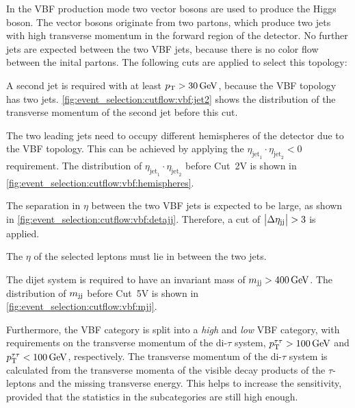 In the VBF production mode two vector bosons are used to produce the Higgs boson.
The vector bosons originate from two partons, which produce two jets with high transverse momentum
in the forward region of the detector.
No further jets are expected between the two VBF jets, because there is no color flow between the inital partons.
The following cuts are applied to select this topology:
\begin{description}[style=nextline,leftmargin=1cm]
    \item[(1V) Subleading jet momentum]
        A second jet is required with at least $\pt > \SI{30}{\GeV}$, because the VBF topology has two jets.
        \cref{fig:event_selection:cutflow:vbf:jet2} shows the distribution of the transverse momentum of the second
        jet before this cut.
    \item[(2V) Opposite hemispheres]
        The two leading jets need to occupy different hemispheres of the detector due to the VBF topology.
        This can be achieved by applying the $\eta_{\text{jet}_1} \cdot \eta_{\text{jet}_2} < 0$ requirement.
        The distribution of $\eta_{\text{jet}_1} \cdot \eta_{\text{jet}_2}$ before Cut~2V is shown in \cref{fig:event_selection:cutflow:vbf:hemispheres}.
    \item[(3V) Angular separation of two leading jets]
        The separation in $\eta$ between the two VBF jets is expected to be large, as shown in \cref{fig:event_selection:cutflow:vbf:detajj}.
        Therefore, a cut of $\left|\Delta \eta_\text{jj}\right| > 3$ is applied.
    \item[(4V) Lepton candidate centrality]
        The $\eta$ of the selected leptons must lie in between the two jets.
    \item[(5V) Invariant mass of the dijet system]
        The dijet system is required to have an invariant mass of $\mjj > \SI{400}{\GeV}$.
        The distribution of $m_{\text{jj}}$ before Cut~5V is shown in \cref{fig:event_selection:cutflow:vbf:mjj}.
\end{description}

Furthermore, the VBF category is split into a \emph{high} and \emph{low} VBF category,
with requirements on the transverse momentum of the di-$\tau$ system, $\pt^{\tau\tau} > \SI{100}{\GeV}$ and $\pt^{\tau\tau} < \SI{100}{\GeV}$, respectively.
The transverse momentum of the di-$\tau$ system is calculated from the transverse momenta of the visible decay products of the
$\tau$-leptons and the missing transverse energy.
This helps to increase the sensitivity, provided that the statistics in the subcategories are still high enough.

